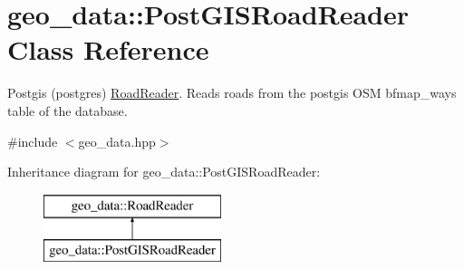 \hypertarget{classgeo__data_1_1PostGISRoadReader}{}\section{geo\+\_\+data\+:\+:Post\+G\+I\+S\+Road\+Reader Class Reference}
\label{classgeo__data_1_1PostGISRoadReader}


Postgis (postgres) \hyperlink{classgeo__data_1_1RoadReader}{Road\+Reader}. Reads roads from the postgis O\+SM bfmap\+\_\+ways table of the database.  




{\ttfamily \#include $<$geo\+\_\+data.\+hpp$>$}

Inheritance diagram for geo\+\_\+data\+:\+:Post\+G\+I\+S\+Road\+Reader\+:\begin{figure}[H]
\begin{center}
\leavevmode
\includegraphics[height=2.000000cm]{classgeo__data_1_1PostGISRoadReader}
\end{center}
\end{figure}
